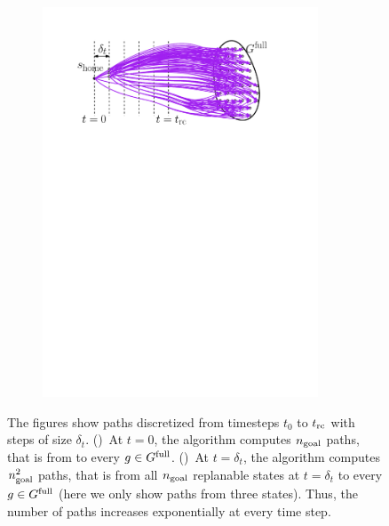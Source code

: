 \documentclass[conference]{IEEEtran}
\begin{document}
\begin{figure}[t]
\begin{subfigure}{0.225\textwidth}
        \includegraphics[width=0.9\textwidth]{naive2}
        \caption{}
        \label{fig:naive2}
    \end{subfigure}
    \caption{
    \CaptionTextSize
    The figures show paths discretized from timesteps $t_0$ to $t_{\textrm{rc}}$ with steps of size $\delta_t$.
    ()~At $t = 0$, the algorithm computes $n_{\rm goal}$ paths, that is from \Shome to every $g \in G^{\textrm{full}}$.
    ()~At $t = \delta_t$, the algorithm computes $n_{\rm goal}^2$ paths, that is from all $n_{\rm goal}$ replanable states at $t = \delta_t$ to every $g \in G^{\textrm{full}}$ (here we only show paths from three states).
    Thus, the number of paths increases exponentially at every time step.
    }
    \label{fig:naive}
\end{figure}
\end{document}

